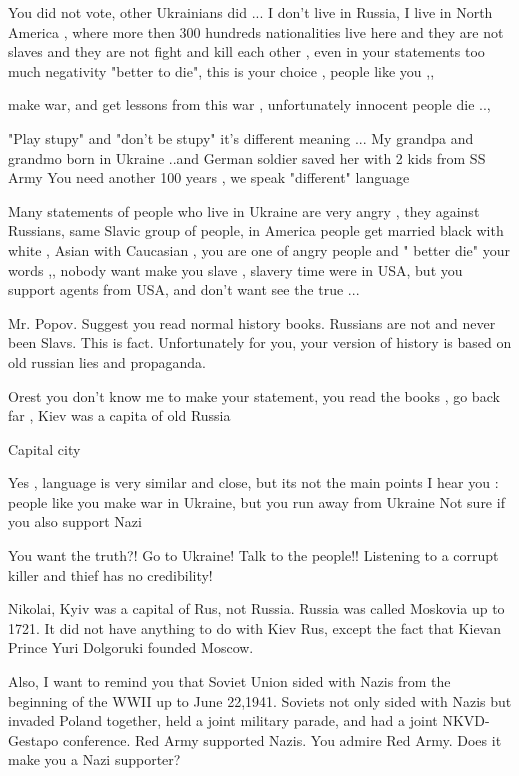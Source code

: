 \begin{itemize}
\begin{itemize}

You did not vote, other Ukrainians did ... I don't live in Russia, I live in
North America , where more then 300 hundreds nationalities live here and they
are not slaves and they are not fight and kill each other , even in your
statements too much negativity "better to die", this is your choice , people
like you ,,

make war, and get lessons from this war , unfortunately innocent people die ..,

"Play stupy" and "don't be stupy" it's different meaning ... My grandpa and
grandmo born in Ukraine ..and German soldier saved her with 2 kids from SS Army
You need another 100 years , we speak "different" language

Many statements of people who live in Ukraine are very angry , they against
Russians, same Slavic group of people, in America people get married black with
white , Asian with Caucasian , you are one of angry people and " better die"
your words ,, nobody want make you slave , slavery time were in USA, but you
support agents from USA, and don't want see the true ...


Mr. Popov. Suggest you read normal history books. Russians are not and never
been Slavs. This is fact. Unfortunately for you, your version of history is
based on old russian lies and propaganda.


Orest you don't know me to make your statement,
you read the books ,
go back far , Kiev was a capita of old Russia

Capital city

Yes , language is very similar and close, but its not the main points
I hear you : people like you make war in Ukraine,
but you run away from Ukraine
Not sure if you also support Nazi


You want the truth?! Go to Ukraine! Talk to the people!!
Listening to a corrupt killer and thief has no credibility!


Nikolai, Kyiv was a capital of Rus, not Russia. Russia was called Moskovia up
to 1721. It did not have anything to do with Kiev Rus, except the fact that
Kievan Prince Yuri Dolgoruki founded Moscow.

Also, I want to remind you that Soviet Union sided with Nazis from the
beginning of the WWII up to June 22,1941. Soviets not only sided with Nazis but
invaded Poland together, held a joint military parade, and had a joint
NKVD-Gestapo conference. Red Army supported Nazis. You admire Red Army. Does it
make you a Nazi supporter?


\end{itemize}
\end{itemize}
